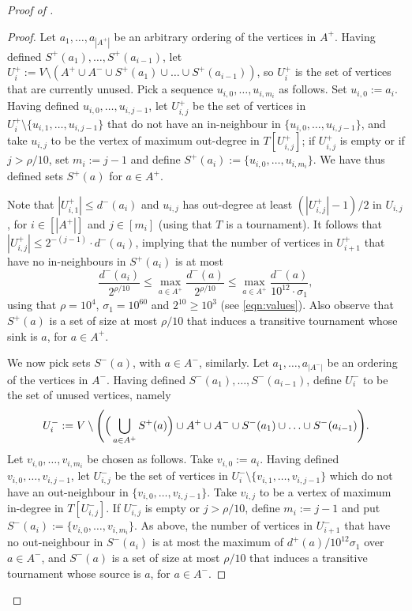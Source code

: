 \documentclass[english]{article}
\theoremstyle{plain}
\theoremstyle{remark}
\def \Sp {S^+}
\def \Sm {S^-}
\def \Ap {A^+}
\def \Am {A^-}
\def \dpp {d^+}
\def \dm {d^-}
\def \Up {U^+}
\def \Um {U^-}
\let\originalleft\left
\let\originalright\right
\renewcommand{\left}{\mathopen{}\mathclose\bgroup\originalleft}
\renewcommand{\right}{\aftergroup\egroup\originalright}
\begin{document}
\begin{proof}[Proof of ]
\begin{proof}
			Let $a_1, \ldots, a_{|\Ap|}$ be an arbitrary ordering of the vertices in $\Ap$. Having defined $\Sp(a_1), \ldots, \Sp(a_{i-1})$, let $\Up_i := V \setminus (\Ap \cup \Am \cup \Sp(a_1) \cup \ldots \cup \Sp(a_{i-1}))$, so $\Up_i$ is the set of vertices that are currently unused. 
			Pick a sequence $u_{i,0}, \ldots, u_{i,m_i}$ as follows. Set $u_{i,0} := a_i$. Having defined $u_{i,0}, \ldots, u_{i,j-1}$, let $\Up_{i,j}$ be the set of vertices in $\Up_i \setminus \{u_{i,1}, \ldots, u_{i,j-1}\}$ that do not have an in-neighbour in $\{u_{i,0}, \ldots, u_{i,j-1}\}$, and take $u_{i,j}$ to be the vertex of maximum out-degree in $T[\Up_{i,j}]$; if $\Up_{i,j}$ is empty or if $j > \rho / 10$, set $m_i := j-1$ and define $\Sp(a_i) := \{u_{i, 0}, \ldots, u_{i, m_i}\}$.
			We have thus defined sets $\Sp(a)$ for $a \in \Ap$.

			Note that $|\Up_{i,1}| \le \dm(a_i)$ and $u_{i,j}$ has out-degree at least $(|\Up_{i, j}| - 1)/2$ in $U_{i, j}$, for $i \in [|\Ap|]$ and $j \in [m_i]$ (using that $T$ is a tournament). It follows that $|\Up_{i, j}| \le 2^{-(j-1)} \cdot \dm(a_i)$, implying that the number of vertices in $\Up_{i+1}$ that have no in-neighbours in $\Sp(a_i)$ is at most 
			\begin{equation} \label{eqn:bad-degree}
				\frac{\dm(a_i)}{2^{\rho/10}} 
				\le \max_{a \in \Ap} \frac{\dm(a)}{2^{\rho/10}} 
				\le \max_{a \in \Ap} \frac{\dm(a)}{10^{12} \cdot \sigma_1},
			\end{equation}
			using that $\rho = 10^4$, $\sigma_1 = 10^{60}$ and $2^{10} \ge 10^3$ (see \eqref{eqn:values}).
			Also observe that $\Sp(a)$ is a set of size at most $\rho / 10$ that induces a transitive tournament whose sink is $a$, for $a \in \Ap$. 

			We now pick sets $\Sm(a)$, with $a \in \Am$, similarly. 
			Let $a_1, \ldots, a_{|\Am|}$ be an ordering of the vertices in $\Am$. Having defined $\Sm(a_1), \ldots, \Sm(a_{i-1})$, define $\Um_i$ to be the set of unused vertices, namely
			\begin{equation*}
				\Um_i := V \setminus \left( \Big(\bigcup_{a \in \Ap} \Sp(a)\Big) \cup \Ap \cup \Am \cup \Sm(a_1) \cup \ldots \cup \Sm(a_{i-1})\right).
			\end{equation*}
			Let $v_{i,0}, \ldots, v_{i, m_i}$ be chosen as follows. Take $v_{i,0} := a_i$. Having defined $v_{i,0}, \ldots, v_{i, j-1}$, let $\Um_{i,j}$ be the set of vertices in $\Um_i \setminus \{v_{i,1}, \ldots, v_{i,j-1}\}$ which do not have an out-neighbour in $\{v_{i,0}, \ldots, v_{i,j-1}\}$. Take $v_{i, j}$ to be a vertex of maximum in-degree in $T[\Um_{i,j}]$. If $\Um_{i,j}$ is empty or $j > \rho/10$, define $m_i := j-1$ and put $\Sm(a_i) := \{v_{i,0}, \ldots, v_{i,m_i}\}$. 
			As above, the number of vertices in $\Um_{i+1}$ that have no out-neighbour in $\Sm(a_i)$ is at most the maximum of $\dpp(a) / 10^{12} \sigma_1$ over $a \in \Am$, and $\Sm(a)$ is a set of size at most $\rho / 10$ that induces a transitive tournament whose source is $a$, for $a \in \Am$. 


\end{proof}
\end{proof}
\end{document}
